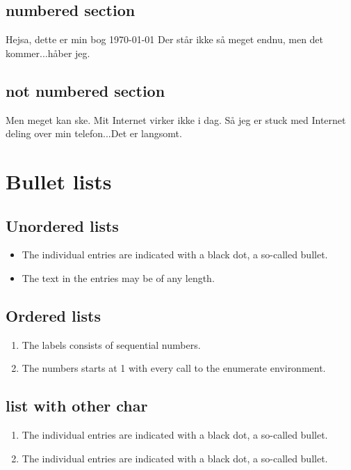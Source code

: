 \documentclass{report}
\begin{document}
\section{numbered section}
Hejsa, dette er min bog 
\today
Der står ikke så meget endnu, men det kommer...håber jeg.
\newpage
\section*{not numbered section}
Men meget kan ske. Mit Internet virker ikke i dag. Så jeg er stuck med Internet deling over min telefon...Det er langsomt.


\chapter{Bullet lists}

\section{Unordered lists}
\begin{itemize}
  \item The individual entries are indicated with a black dot, a so-called bullet.
  \item The text in the entries may be of any length.
\end{itemize}

\section{Ordered lists}
\begin{enumerate}
  \item The labels consists of sequential numbers.
  \item The numbers starts at 1 with every call to the enumerate environment.
\end{enumerate}

\section{list with other char}


\begin{enumerate}[-a]
  \item The individual entries are indicated with a black dot, a so-called bullet.
\item The individual entries are indicated with a black dot, a so-called bullet.
\end{enumerate}
\end{document}
